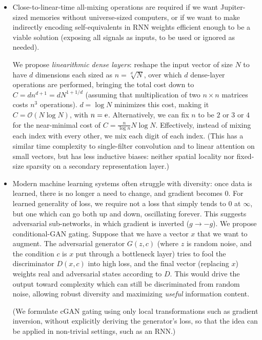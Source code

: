 \documentclass{article}
\begin{document}
\begin{itemize}
\item Close-to-linear-time all-mixing operations are required if we want Jupiter-sized memories without universe-sized computers, or if we want to make indirectly encoding self-equivalents in RNN weights efficient enough to be a viable solution (exposing all signals as inputs, to be used or ignored as needed).

We propose \textit{linearithmic dense layers}: reshape the input vector of size $N$ to have $d$ dimensions each sized as $n=\sqrt[d]{N}$, over which $d$ dense-layer operations are performed, bringing the total cost down to $C=dn^{d+1}=d N^{1+1/d}$ (assuming that multiplication of two $n \times n$ matrices costs $n^3$ operations). $d=\log{N}$ minimizes this cost, making it $C=\mathcal{O}(N \log{N})$, with $n={\rm e}$. Alternatively, we can fix $n$ to be $2$ or $3$ or $4$ for the near-minimal cost of $C=\frac{n}{\log{n}} N \log{N}$. Effectively, instead of mixing each index with every other, we mix each digit of each index. (This has a similar time complexity to single-filter convolution and to linear attention \cite{vaswani2017attention} on small vectors, but has less inductive biases: neither spatial locality nor fixed-size sparsity on a secondary representation layer.)

\item Modern machine learning systems often struggle with diversity: once data is learned, there is no longer a need to change, and gradient becomes $0$. For learned generality of loss, we require not a loss that simply tends to $0$ at $\infty$, but one which can go both up and down, oscillating forever. This suggests adversarial sub-networks, in which gradient is inverted ($g \rightarrow -g$). We propose conditional-GAN \cite{DBLP:journals/corr/IsolaZZE16} gating. Suppose that we have a vector $x$ that we want to augment. The adversarial generator $G(z,c)$ (where $z$ is random noise, and the condition $c$ is $x$ put through a bottleneck layer) tries to fool the discriminator $D(x,c)$ into high loss, and the final vector (replacing $x$) weights real and adversarial states according to $D$. This would drive the output toward complexity which can still be discriminated from random noise, allowing robust diversity and maximizing \textit{useful} information content.

(We formulate cGAN gating using only local transformations such as gradient inversion, without explicitly deriving the generator's loss, so that the idea can be applied in non-trivial settings, such as an RNN.)
\end{itemize}
\end{document}

